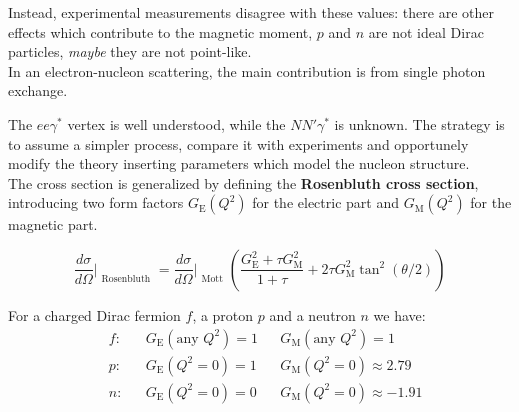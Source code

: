 \documentclass[10.75pt,a4paper,openright,bottom=2cm]{article}
\begin{document}
Instead, experimental measurements disagree with these values: there are other effects which contribute to the magnetic moment, $p$ and $n$ are not ideal Dirac particles, \textit{maybe} they are not point-like.\\
In an electron-nucleon scattering, the main contribution is from single photon exchange.\\
\begin{center}
\end{center}   
The $ee\gamma^*$ vertex is well understood, while the $NN'\gamma^*$ is unknown. The strategy is to assume a simpler process, compare it with experiments and opportunely modify the theory inserting parameters which model the nucleon structure.\\
The cross section is generalized by defining the \textbf{Rosenbluth cross section}, introducing two form factors $G_{\text{E}}(Q^2)$ for the electric part and $G_{\text{M}}(Q^2)$ for the magnetic part.
\begin{tcolorbox}[width=\textwidth,colback={yellow!50},title={Rosenbluth Cross Section},colbacktitle={gray!50},coltitle=black]
\[
\frac{d\sigma}{d\Omega}\Bigr|_{\substack{\text{Rosenbluth}}}=\frac{d\sigma}{d\Omega}\Bigr|_{\substack{\text{Mott}}}\left(\frac{G_{\text{E}}^2+\tau G_{\text{M}}^2}{1+\tau}+2\tau G_{\text{M}}^2\tan^2(\theta/2)\right)
\]
\end{tcolorbox}
\noindent
For a charged Dirac fermion $f$, a proton $p$ and a neutron $n$ we have:
\[
\begin{aligned}
&f: &&G_{\text{E}}(\text{any $Q^2$})=1 &&G_{\text{M}}(\text{any $Q^2$})=1\\
&p: &&G_{\text{E}}(Q^2=0)=1 &&G_{\text{M}}(Q^2=0)\approx2.79\\
&n: &&G_{\text{E}}(Q^2=0)=0 &&G_{\text{M}}(Q^2=0)\approx-1.91
\end{aligned}
\]
\end{document}
